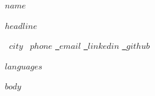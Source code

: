 \documentclass[10pt, a4paper]{article}
\begin{document}
{\centering
  {\fontsize{19pt}{21pt}\selectfont\textcolor{accent}{$name$}}\par
  \vspace{5pt}
  {\normalsize\textcolor{accent}{$headline$}}\par
  \vspace{6pt}
  {\footnotesize
    \textcolor{accent}{\faMapMarker*}~$city$\enspace
    \textcolor{accent}{\faPhone*}~$phone$\enspace
    \href{mailto:$email$}{\textcolor{accent}{\faEnvelope}~$email$}\enspace
    \href{https://$linkedin$}{\textcolor{accent}{\faLinkedin}~$linkedin$}\enspace
    \href{https://$github$}{\textcolor{accent}{\faGithub}~$github$}}\par
  \vspace{3pt}
  {\footnotesize\textit{$languages$}}\par
}
\vspace{6pt}
$body$
\end{document}
